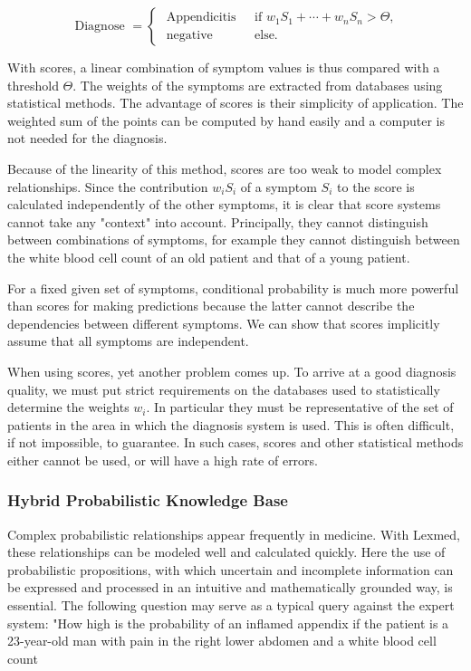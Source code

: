 \documentclass[10pt]{article}
\begin{document}
$$
\text { Diagnose }= \begin{cases}\text { Appendicitis } & \text { if } w_{1} S_{1}+\cdots+w_{n} S_{n}>\Theta, \\ \text { negative } & \text { else. }\end{cases}
$$

With scores, a linear combination of symptom values is thus compared with a threshold $\Theta$. The weights of the symptoms are extracted from databases using statistical methods. The advantage of scores is their simplicity of application. The weighted sum of the points can be computed by hand easily and a computer is not needed for the diagnosis.

Because of the linearity of this method, scores are too weak to model complex relationships. Since the contribution $w_{i} S_{i}$ of a symptom $S_{i}$ to the score is calculated independently of the other symptoms, it is clear that score systems cannot take any "context" into account. Principally, they cannot distinguish between combinations of symptoms, for example they cannot distinguish between the white blood cell count of an old patient and that of a young patient.

For a fixed given set of symptoms, conditional probability is much more powerful than scores for making predictions because the latter cannot describe the dependencies between different symptoms. We can show that scores implicitly assume that all symptoms are independent.

When using scores, yet another problem comes up. To arrive at a good diagnosis quality, we must put strict requirements on the databases used to statistically determine the weights $w_{i}$. In particular they must be representative of the set of patients in the area in which the diagnosis system is used. This is often difficult, if not impossible, to guarantee. In such cases, scores and other statistical methods either cannot be used, or will have a high rate of errors.

\subsubsection*{Hybrid Probabilistic Knowledge Base}
Complex probabilistic relationships appear frequently in medicine. With Lexmed, these relationships can be modeled well and calculated quickly. Here the use of probabilistic propositions, with which uncertain and incomplete information can be expressed and processed in an intuitive and mathematically grounded way, is essential. The following question may serve as a typical query against the expert system: "How high is the probability of an inflamed appendix if the patient is a 23-year-old man with pain in the right lower abdomen and a white blood cell count
\end{document}
